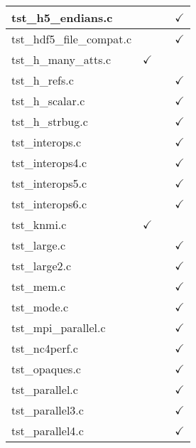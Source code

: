 \begin{table}[H]
\begin{tabular}{|l|c|c|c|}
tst\_h5\_endians.c      &               &               & $\checkmark$    \\ \hline
tst\_hdf5\_file\_compat.c  &            &               & $\checkmark$    \\ \hline
tst\_h\_many\_atts.c    & $\checkmark$  &               &                 \\ \hline
tst\_h\_refs.c          &               &               & $\checkmark$    \\ \hline
tst\_h\_scalar.c        &               &               & $\checkmark$    \\ \hline
tst\_h\_strbug.c        &               &               & $\checkmark$    \\ \hline
tst\_interops.c         &               &               & $\checkmark$    \\ \hline
tst\_interops4.c        &               &               & $\checkmark$    \\ \hline
tst\_interops5.c        &               &               & $\checkmark$    \\ \hline
tst\_interops6.c        &               &               & $\checkmark$    \\ \hline
tst\_knmi.c             & $\checkmark$  &               &                 \\ \hline
tst\_large.c            &               &               & $\checkmark$    \\ \hline
tst\_large2.c           &               &               & $\checkmark$    \\ \hline
tst\_mem.c              &               &               & $\checkmark$    \\ \hline
tst\_mode.c             &               &               & $\checkmark$    \\ \hline
tst\_mpi\_parallel.c    &               &               & $\checkmark$    \\ \hline
tst\_nc4perf.c          &               &               & $\checkmark$    \\ \hline
tst\_opaques.c          &               &               & $\checkmark$    \\ \hline
tst\_parallel.c         &               &               & $\checkmark$    \\ \hline
tst\_parallel3.c        &               &               & $\checkmark$    \\ \hline
tst\_parallel4.c        &               &               & $\checkmark$    \\ \hline

\end{tabular}
\end{table}
